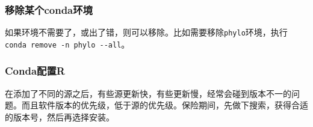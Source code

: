 \documentclass[]{article}
\numberwithin{figure}{section}
\numberwithin{table}{section}
\begin{document}
\hypertarget{remove_conda}{%
\subsubsection{移除某个conda环境}\label{remove_conda}}

如果环境不需要了，或出了错，则可以移除。比如需要移除\texttt{phylo}环境，执行\texttt{conda\ remove\ -n\ phylo\ -\/-all}。

\hypertarget{conda-R}{%
\subsubsection{Conda配置R}\label{conda-R}}

在添加了不同的源之后，有些源更新快，有些更新慢，经常会碰到版本不一的问题。而且软件版本的优先级，低于源的优先级。保险期间，先做下搜索，获得合适的版本号，然后再选择安装。
\end{document}
